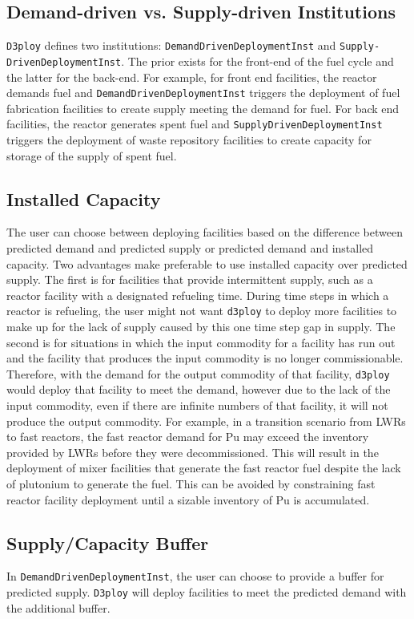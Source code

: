 \documentclass[11pt]{article}
\newcommand{\deploy}{\texttt{d3ploy}\xspace}%
\newcommand{\Deploy}{\texttt{D3ploy}\xspace}%
\begin{document}
\subsection{\textbf{Demand-driven vs. Supply-driven Institutions}}
\Deploy defines two institutions: \texttt{DemandDrivenDeploymentInst} and \texttt{Supply-}
\noindent
\texttt{DrivenDeploymentInst}.
The prior exists for the front-end of the fuel cycle and the latter 
for the back-end. 
For example, for front end facilities, the reactor demands 
fuel and \texttt{DemandDrivenDeploymentInst} triggers the deployment 
of fuel fabrication facilities to create supply meeting the demand 
for fuel.
For back end facilities, the reactor generates spent fuel 
and \texttt{SupplyDrivenDeploymentInst} triggers the deployment of 
waste repository facilities to create capacity for storage of the supply 
of spent fuel. 

\subsection{\textbf{Installed Capacity}}
The user can choose between deploying facilities based on the difference 
between predicted demand and predicted supply or predicted demand and 
installed capacity.
Two advantages make preferable to use installed capacity over predicted 
supply. 
The first is for facilities that provide intermittent supply, such as a 
reactor facility with a designated refueling time. 
During time steps in which a reactor is refueling, the user might not 
want \deploy to deploy more facilities to make up for the lack of supply
caused by this one time step gap in supply. 
The second is for situations in which the input commodity for a facility has
run out and the facility that produces the input commodity 
is no longer commissionable. 
Therefore, with the demand for the output commodity of that facility, \deploy
would deploy that facility to meet the demand, however due to the lack of 
the input commodity, even if there are infinite numbers of that facility, 
it will not produce the output commodity. 
For example, in a transition scenario from LWRs to fast reactors, the fast 
reactor demand for Pu may exceed the inventory provided by LWRs before 
they were decommissioned. 
This will result in the deployment of mixer facilities that generate the 
fast reactor fuel despite the lack of plutonium to generate the fuel. 
This can be avoided by constraining fast reactor facility deployment 
until a sizable inventory of Pu is accumulated. 

\subsection{\textbf{Supply/Capacity Buffer}}
In \texttt{DemandDrivenDeploymentInst}, the user can choose to provide a
buffer for predicted supply.
\Deploy will deploy facilities to meet the predicted demand with the 
additional buffer. 
\end{document}
